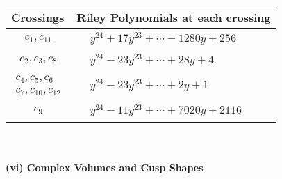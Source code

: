 \documentclass[1p]{elsarticle_modified}
\theoremstyle{definition}
\begin{document}
\begin{tabular}{m{50pt}|m{274pt}}
Crossings & \hspace{64pt}Riley Polynomials at each crossing \\
\hline $$\begin{aligned}c_{1},c_{11}\end{aligned}$$&$\begin{aligned}
&y^{24}+17 y^{23}+\cdots-1280 y+256
\end{aligned}$\\
\hline $$\begin{aligned}c_{2},c_{3},c_{8}\end{aligned}$$&$\begin{aligned}
&y^{24}-23 y^{23}+\cdots+28 y+4
\end{aligned}$\\
\hline $$\begin{aligned}c_{4},c_{5},c_{6}\\c_{7},c_{10},c_{12}\end{aligned}$$&$\begin{aligned}
&y^{24}-23 y^{23}+\cdots+2 y+1
\end{aligned}$\\
\hline $$\begin{aligned}c_{9}\end{aligned}$$&$\begin{aligned}
&y^{24}-11 y^{23}+\cdots+7020 y+2116
\end{aligned}$\\
\hline
\end{tabular}\\~\\
\newpage\flushleft \textbf{(vi) Complex Volumes and Cusp Shapes}
\end{document}
